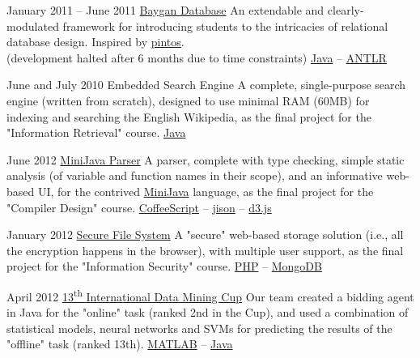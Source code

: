 \documentclass{tccv}
\begin{document}
{{\begin{project_list}
\vspace{-3pt}


\item{January 2011 -- June 2011}
	 {}
	 {\href{https://github.com/baygan/Baygan}{Baygan Database}}
	 {An extendable and clearly-modulated framework for introducing students to the intricacies of relational database design. Inspired by \href{http://www.stanford.edu/class/cs140/projects/pintos/pintos.html}{pintos}.\\
(development halted after 6 months due to time constraints)}
	 {
	 	\href{http://www.oracle.com/technetwork/java/}{Java} -- 
		\href{http://www.antlr.org}{ANTLR}
	 }
	 

\vspace{5pt}
	 
	 
\item{June and July 2010}
	 {}
	 {Embedded Search Engine}
	 {A complete, single-purpose search engine (written from scratch), designed to use minimal RAM (60MB) for indexing and searching the English Wikipedia, as the final project for the "Information Retrieval" course.}
	 {
		 \href{http://www.oracle.com/technetwork/java/}{Java}
	 }



\item{June 2012}
	 {}
	 {\href{https://github.com/pooriaazimi/Mini-Java}{MiniJava Parser}}
	 {A parser, complete with type checking, simple static analysis (of variable and function names in their scope), and an informative web-based UI, for the contrived \href{http://www.cambridge.org/resources/052182060X/MCIIJ2e/grammar.htm}{MiniJava} language, as the final project for the "Compiler Design" course.}
	 {
		 \href{http://coffeescript.org}{CoffeeScript} -- 
		 \href{http://zaach.github.io/jison/}{jison} -- 
		 \href{http://d3js.org}{d3.js}
	 }



\item{January 2012}
	 {}
	 {\href{https://github.com/pooriaazimi/secure_file_system}{Secure File System}}
	 {A "secure" web-based storage solution (i.e., all the encryption happens in the browser), with multiple user support, as the final project for the "Information Security" course.}
	 {
		 \href{http://php.net}{PHP} -- 
		 \href{http://www.mongodb.org}{MongoDB}
	 }



\item{April 2012}
	 {}
	 {\href{http://www.data-mining-cup.de/en/review/dmc-2012/}{13\textsuperscript{th} International Data Mining Cup}}
	 {Our team created a bidding agent in Java for the "online" task (ranked 2nd in the Cup), and used a combination of statistical models, neural networks and SVMs for predicting the results of the "offline" task (ranked 13th).}
	 {
	 	\href{http://www.mathworks.com/products/matlab/}{MATLAB} -- 
	 	\href{http://www.oracle.com/technetwork/java/}{Java}
	 }




\end{project_list}}}
\end{document}
